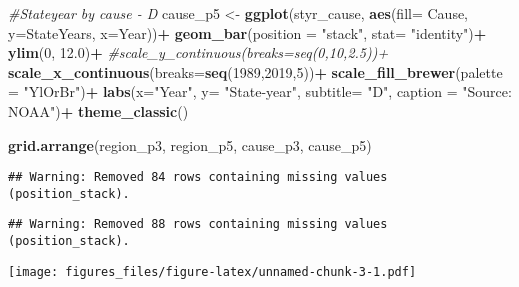 \documentclass[
]{article}
\newenvironment{Shaded}{\begin{snugshade}}{\end{snugshade}}
\newcommand{\CommentTok}[1]{\textcolor[rgb]{0.56,0.35,0.01}{\textit{#1}}}
\newcommand{\DataTypeTok}[1]{\textcolor[rgb]{0.13,0.29,0.53}{#1}}
\newcommand{\DecValTok}[1]{\textcolor[rgb]{0.00,0.00,0.81}{#1}}
\newcommand{\FloatTok}[1]{\textcolor[rgb]{0.00,0.00,0.81}{#1}}
\newcommand{\KeywordTok}[1]{\textcolor[rgb]{0.13,0.29,0.53}{\textbf{#1}}}
\newcommand{\NormalTok}[1]{#1}
\newcommand{\OperatorTok}[1]{\textcolor[rgb]{0.81,0.36,0.00}{\textbf{#1}}}
\newcommand{\StringTok}[1]{\textcolor[rgb]{0.31,0.60,0.02}{#1}}
\begin{document}
\begin{Shaded}
\begin{Highlighting}[]
\CommentTok{#Stateyear by cause - D}
\NormalTok{cause_p5 <-}\StringTok{ }\KeywordTok{ggplot}\NormalTok{(styr_cause, }\KeywordTok{aes}\NormalTok{(}\DataTypeTok{fill=}\NormalTok{ Cause, }\DataTypeTok{y=}\NormalTok{StateYears, }\DataTypeTok{x=}\NormalTok{Year))}\OperatorTok{+}
\StringTok{  }\KeywordTok{geom_bar}\NormalTok{(}\DataTypeTok{position =} \StringTok{"stack"}\NormalTok{, }\DataTypeTok{stat=} \StringTok{"identity"}\NormalTok{)}\OperatorTok{+}
\StringTok{  }\KeywordTok{ylim}\NormalTok{(}\DecValTok{0}\NormalTok{, }\FloatTok{12.0}\NormalTok{)}\OperatorTok{+}
\StringTok{  }\CommentTok{#scale_y_continuous(breaks=seq(0,10,2.5))+}
\StringTok{  }\KeywordTok{scale_x_continuous}\NormalTok{(}\DataTypeTok{breaks=}\KeywordTok{seq}\NormalTok{(}\DecValTok{1989}\NormalTok{,}\DecValTok{2019}\NormalTok{,}\DecValTok{5}\NormalTok{))}\OperatorTok{+}
\StringTok{  }\KeywordTok{scale_fill_brewer}\NormalTok{(}\DataTypeTok{palette =} \StringTok{"YlOrBr"}\NormalTok{)}\OperatorTok{+}
\StringTok{  }\KeywordTok{labs}\NormalTok{(}\DataTypeTok{x=}\StringTok{"Year"}\NormalTok{, }\DataTypeTok{y=} \StringTok{"State-year"}\NormalTok{, }\DataTypeTok{subtitle=} \StringTok{"D"}\NormalTok{, }\DataTypeTok{caption =} \StringTok{"Source: NOAA"}\NormalTok{)}\OperatorTok{+}
\StringTok{  }\KeywordTok{theme_classic}\NormalTok{()}


\KeywordTok{grid.arrange}\NormalTok{(region_p3, region_p5, cause_p3, cause_p5)}
\end{Highlighting}
\end{Shaded}

\begin{verbatim}
## Warning: Removed 84 rows containing missing values (position_stack).
\end{verbatim}

\begin{verbatim}
## Warning: Removed 88 rows containing missing values (position_stack).
\end{verbatim}

\texttt{[image: figures\_files/figure-latex/unnamed-chunk-3-1.pdf]}
\end{document}
